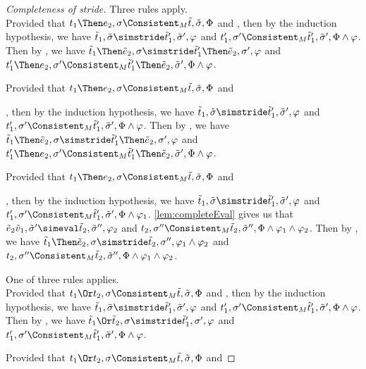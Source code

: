 \begin{proof}[Completeness of stride]
  {
  Three rules apply.\\
   {
     Provided that $t_1\Then e_2,\sigma\Consistent_M \tilde{t},\tilde{\sigma},\Phi$ and ,
     then by the induction hypothesis, we have $\tilde{t}_1,\tilde{\sigma}\simstride\tilde{t}_1',\tilde{\sigma}',\phi$
     and $t_1',\sigma'\Consistent_M\tilde{t}_1',\tilde{\sigma}',\Phi\land\phi$.
     Then by , we have $\tilde{t}_1\Then\tilde{e}_2,\sigma\simstride\tilde{t}_1'\Then\tilde{e}_2,\sigma',\phi$
     and $t_1'\Then e_2,\sigma'\Consistent_M\tilde{t}_1'\Then \tilde{e}_2,\tilde{\sigma}',\Phi\land\phi$.
  }
   {
   Provided that $t_1\Then e_2,\sigma\Consistent_M \tilde{t},\tilde{\sigma},\Phi$ and

   ,
   then by the induction hypothesis, we have $\tilde{t}_1,\tilde{\sigma}\simstride\tilde{t}_1',\tilde{\sigma}',\phi$
   and $t_1',\sigma'\Consistent_M\tilde{t}_1',\tilde{\sigma}',\Phi\land\phi$.
   Then by , we have $\tilde{t}_1\Then\tilde{e}_2,\sigma\simstride\tilde{t}_1'\Then\tilde{e}_2,\sigma',\phi$
   and $t_1'\Then e_2,\sigma'\Consistent_M\tilde{t}_1'\Then \tilde{e}_2,\tilde{\sigma}',\Phi\land\phi$.
   }
   {
   Provided that $t_1\Then e_2,\sigma\Consistent_M \tilde{t},\tilde{\sigma},\Phi$ and

   ,
   then by the induction hypothesis, we have $\tilde{t}_1,\tilde{\sigma}\simstride\tilde{t}_1',\tilde{\sigma}',\phi$
   and $t_1',\sigma'\Consistent_M\tilde{t}_1',\tilde{\sigma}',\Phi\land\phi_1$.
   \cref{lem:completeEval} gives us that $\tilde{e}_2 \tilde{v}_1,\tilde{\sigma}'\simeval \tilde{t}_2,\tilde{\sigma}'',\phi_2$
   and $t_2,\sigma''\Consistent_M\tilde{t}_2,\tilde{\sigma}'',\Phi\land\phi_1\land\phi_2$.
   Then by , we have $\tilde{t}_1\Then\tilde{e}_2,\sigma\simstride\tilde{t}_2,\sigma'',\phi_1\land\phi_2$
   and $t_2,\sigma''\Consistent_M\tilde{t}_2,\tilde{\sigma}'',\Phi\land\phi_1\land\phi_2$.
   }
  }

  {
  One of three rules applies.\\
   {
   Provided that $t_1\Or t_2,\sigma\Consistent_M \tilde{t},\tilde{\sigma},\Phi$ and ,
   then by the induction hypothesis, we have $\tilde{t}_1,\tilde{\sigma}\simstride\tilde{t}_1',\tilde{\sigma}',\phi$
   and $t_1',\sigma'\Consistent_M\tilde{t}_1',\tilde{\sigma}',\Phi\land\phi$.
   Then by , we have $\tilde{t}_1\Or\tilde{t}_2,\sigma\simstride\tilde{t}_1',\sigma',\phi$
   and $t_1',\sigma'\Consistent_M\tilde{t}_1',\tilde{\sigma}',\Phi\land\phi$.
  }
   {
   Provided that $t_1\Or t_2,\sigma\Consistent_M \tilde{t},\tilde{\sigma},\Phi$ and

}}
\end{proof}

